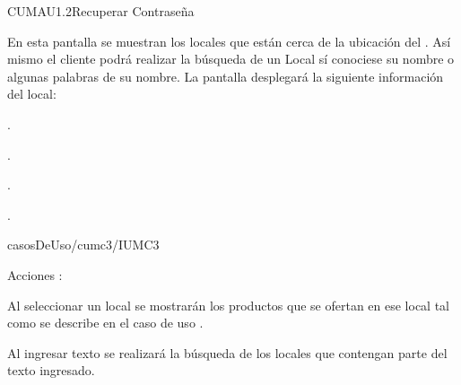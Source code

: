 \begin{IU}{CUMAU1.2}{Recuperar Contraseña}{En esta pantalla se muestran los locales que están cerca de la ubicación del . Así mismo el cliente podrá realizar la búsqueda de un Local sí conociese su nombre o algunas palabras de su nombre. La pantalla desplegará la siguiente información del local:	\begin{Citemize}
		\item {}.
		\item {}.
		\item {}.
		\item {}.
	\end{Citemize}}{casosDeUso/cumc3/IUMC3}
	\item[Acciones]:\hspace{1pt}
		\begin{Citemize}
			\item Al seleccionar un local se mostrarán los productos que se ofertan en ese local tal como se describe en el caso de uso .
			\item Al ingresar texto  se realizará la búsqueda de los locales que contengan parte del texto ingresado.
		\end{Citemize}

\end{IU}